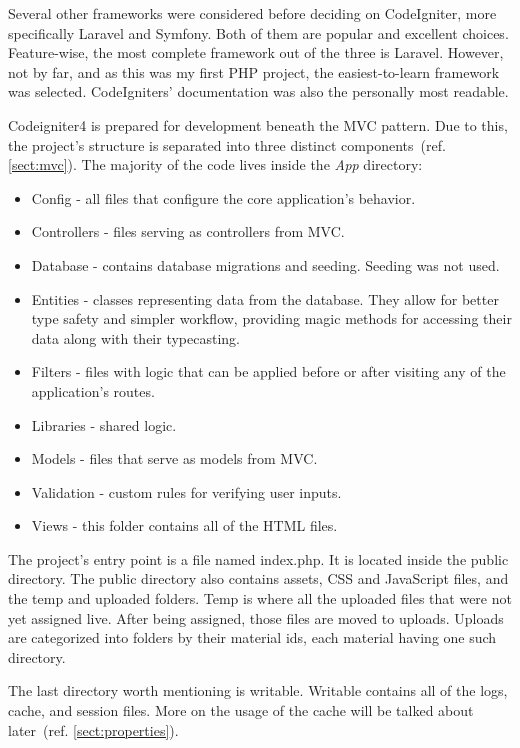 \documentclass[
  digital,     %
  oneside,     %
  nosansbold,  %
  colorbold, %
  lof,         %
  lot,         %
]{fithesis4}
\newcommand{\cref}[1]{(ref. \ref{#1})}
\begin{document}
Several other frameworks were considered before deciding on CodeIgniter, more specifically Laravel
and Symfony. Both of them are popular and excellent choices. Feature-wise, the most complete
framework out of the three is Laravel. However, not by far, and as this was my first PHP project, the
easiest-to-learn framework was selected. CodeIgniters' documentation was also the personally most
readable.

Codeigniter4 is prepared for development beneath the MVC pattern. Due to this, the project's
structure is separated into three distinct components~\cref{sect:mvc}. The majority of the code lives
inside the \textit{App} directory:

\begin{itemize}
	\item Config - all files that configure the core application's behavior.
	\item Controllers - files serving as controllers from MVC.
	\item Database - contains database migrations and seeding. Seeding was not used.
	\item Entities - classes representing data from the database. They allow for better
	type safety and simpler workflow, providing magic methods for accessing their data
	along with their typecasting.
	\item Filters - files with logic that can be applied before or after visiting any of
	the application's routes.
	\item Libraries - shared logic.
	\item Models - files that serve as models from MVC.
	\item Validation - custom rules for verifying user inputs.
	\item Views - this folder contains all of the HTML files.
\end{itemize}

The project's entry point is a file named index.php. It is located inside the public directory. The public
directory also contains assets, CSS and JavaScript files, and the temp and uploaded folders. Temp is
where all the uploaded files that were not yet assigned live. After being assigned, those files are
moved to uploads. Uploads are categorized into folders by their material ids, each material having one
such directory.

The last directory worth mentioning is writable. Writable contains all of the logs, cache, and session
files. More on the usage of the cache will be talked about later~\cref{sect:properties}.
 
\end{document}
